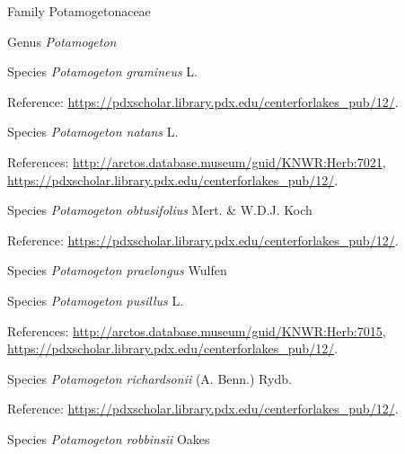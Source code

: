 \documentclass[9pt, article]{memoir}
\begin{document}
\begin{multicols}{2}
\vspace{6pt}\noindent\hspace{24pt}Family Potamogetonaceae


\vspace{6pt}\noindent\hspace{30pt}Genus \textit{Potamogeton}


\vspace{6pt}\noindent\hspace{36pt}Species \textit{Potamogeton gramineus} L.


\vspace{6pt}Reference: 
\url{https://pdxscholar.library.pdx.edu/centerforlakes_pub/12/}.

\vspace{6pt}\noindent\hspace{36pt}Species \textit{Potamogeton natans} L.


\vspace{6pt}References: 
\url{http://arctos.database.museum/guid/KNWR:Herb:7021}, 
\url{https://pdxscholar.library.pdx.edu/centerforlakes_pub/12/}.

\vspace{6pt}\noindent\hspace{36pt}Species \textit{Potamogeton obtusifolius} Mert. \& W.D.J. Koch


\vspace{6pt}Reference: 
\url{https://pdxscholar.library.pdx.edu/centerforlakes_pub/12/}.

\vspace{6pt}\noindent\hspace{36pt}Species \textit{Potamogeton praelongus} Wulfen


\vspace{6pt}\noindent\hspace{36pt}Species \textit{Potamogeton pusillus} L.


\vspace{6pt}References: 
\url{http://arctos.database.museum/guid/KNWR:Herb:7015}, 
\url{https://pdxscholar.library.pdx.edu/centerforlakes_pub/12/}.

\vspace{6pt}\noindent\hspace{36pt}Species \textit{Potamogeton richardsonii} (A. Benn.) Rydb.


\vspace{6pt}Reference: 
\url{https://pdxscholar.library.pdx.edu/centerforlakes_pub/12/}.

\vspace{6pt}\noindent\hspace{36pt}Species \textit{Potamogeton robbinsii} Oakes



\end{multicols}
\end{document}
